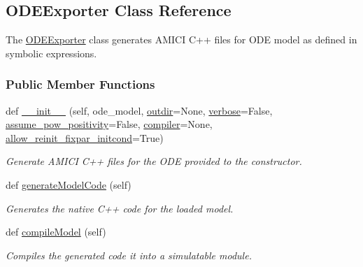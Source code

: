 \hypertarget{classamici_1_1ode__export_1_1_o_d_e_exporter}{}\subsection{O\+D\+E\+Exporter Class Reference}
\label{classamici_1_1ode__export_1_1_o_d_e_exporter}


The \mbox{\hyperlink{classamici_1_1ode__export_1_1_o_d_e_exporter}{O\+D\+E\+Exporter}} class generates A\+M\+I\+CI C++ files for O\+DE model as defined in symbolic expressions.  


\subsubsection*{Public Member Functions}
\begin{DoxyCompactItemize}
\item 
def \mbox{\hyperlink{classamici_1_1ode__export_1_1_o_d_e_exporter_ade5a56f9eda68f70b441b904113d766b}{\+\_\+\+\_\+init\+\_\+\+\_\+}} (self, ode\+\_\+model, \mbox{\hyperlink{classamici_1_1ode__export_1_1_o_d_e_exporter_aac4f80ee02f9c658ec0633be070b1c1b}{outdir}}=None, \mbox{\hyperlink{classamici_1_1ode__export_1_1_o_d_e_exporter_aa9e289eddb591991c9bc7321dc5b186b}{verbose}}=False, \mbox{\hyperlink{classamici_1_1ode__export_1_1_o_d_e_exporter_a29c4626a170365ee3773218f11565690}{assume\+\_\+pow\+\_\+positivity}}=False, \mbox{\hyperlink{classamici_1_1ode__export_1_1_o_d_e_exporter_a3da8f16c6fe93b3b56fc83d5ceda9ead}{compiler}}=None, \mbox{\hyperlink{classamici_1_1ode__export_1_1_o_d_e_exporter_a50ba58e6df269149d17dda632a15620a}{allow\+\_\+reinit\+\_\+fixpar\+\_\+initcond}}=True)
\begin{DoxyCompactList}\small\item\em Generate A\+M\+I\+CI C++ files for the O\+DE provided to the constructor. \end{DoxyCompactList}\item 
def \mbox{\hyperlink{classamici_1_1ode__export_1_1_o_d_e_exporter_a3ec6677c764c1a2d57a51d8a9f468310}{generate\+Model\+Code}} (self)
\begin{DoxyCompactList}\small\item\em Generates the native C++ code for the loaded model. \end{DoxyCompactList}\item 
def \mbox{\hyperlink{classamici_1_1ode__export_1_1_o_d_e_exporter_a61bf03049b9989d73b584fbca9f8d499}{compile\+Model}} (self)
\begin{DoxyCompactList}\small\item\em Compiles the generated code it into a simulatable module. \end{DoxyCompactList}\item 

\end{DoxyCompactItemize}
